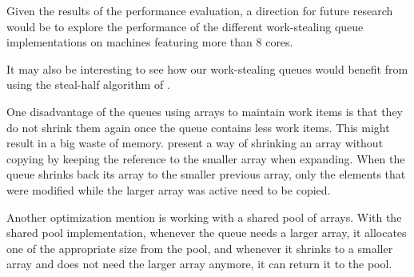 Given the results of the performance evaluation, a direction for
future research would be to explore the performance of the different
work-stealing queue implementations on machines featuring more than 8
cores.

It may also be interesting to see how our work-stealing queues would
benefit from using the steal-half algorithm of \textcite{Hendler2002}.

One disadvantage of the queues using arrays to maintain work items is
that they do not shrink them again once the queue contains less work
items. This might result in a big waste of
memory. \textcite{Chase2005} present a way of shrinking an array
without copying by keeping the reference to the smaller array when
expanding. When the queue shrinks back its array to the smaller
previous array, only the elements that were modified while the larger
array was active need to be copied.

Another optimization \textcite{Chase2005} mention is working with a
shared pool of arrays. With the shared pool implementation, whenever
the queue needs a larger array, it allocates one of the appropriate
size from the pool, and whenever it shrinks to a smaller array and
does not need the larger array anymore, it can return it to the pool.


